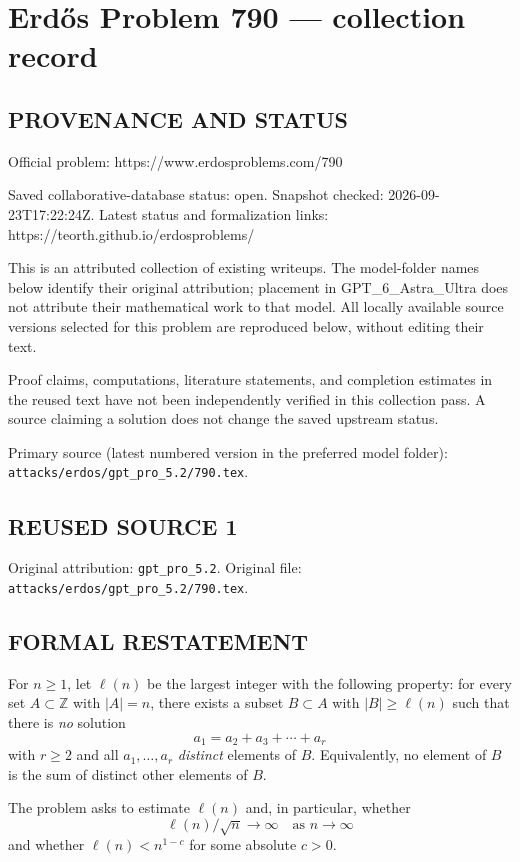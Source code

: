 \section*{Erd\H{o}s Problem 790 --- collection record}

\subsection*{PROVENANCE AND STATUS}
Official problem: https://www.erdosproblems.com/790

Saved collaborative-database status: open.
Snapshot checked: 2026-09-23T17:22:24Z.
Latest status and formalization links: https://teorth.github.io/erdosproblems/

This is an attributed collection of existing writeups. The model-folder names below identify their original attribution; placement in GPT\_6\_Astra\_Ultra does not attribute their mathematical work to that model. All locally available source versions selected for this problem are reproduced below, without editing their text.

Proof claims, computations, literature statements, and completion estimates in the reused text have not been independently verified in this collection pass. A source claiming a solution does not change the saved upstream status.

Primary source (latest numbered version in the preferred model folder): \texttt{attacks/erdos/gpt\_pro\_5.2/790.tex}.

\subsection*{REUSED SOURCE 1}
Original attribution: \texttt{gpt\_pro\_5.2}.
Original file: \texttt{attacks/erdos/gpt\_pro\_5.2/790.tex}.


\subsection*{FORMAL RESTATEMENT}
For $n\ge 1$, let $\ell(n)$ be the largest integer with the following property:
for every set $A\subset \mathbb Z$ with $|A|=n$, there exists a subset $B\subset A$ with
$|B|\ge \ell(n)$ such that there is \emph{no} solution
\[
 a_1 = a_2 + a_3 + \cdots + a_r
\]
with $r\ge 2$ and all $a_1,\dots,a_r$ \emph{distinct} elements of $B$.
Equivalently, no element of $B$ is the sum of distinct other elements of $B$.

The problem asks to estimate $\ell(n)$ and, in particular, whether
\[\ell(n)/\sqrt n \to \infty\quad\text{as }n\to\infty\]
and whether $\ell(n)< n^{1-c}$ for some absolute $c>0$.

